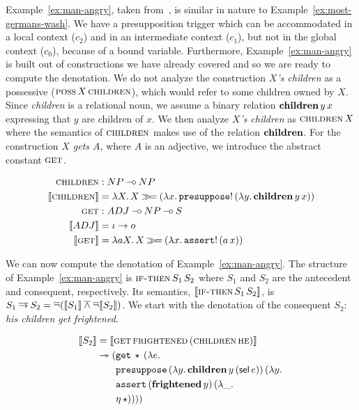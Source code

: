 Example~\ref{ex:man-angry}, taken from~\cite{van1992presupposition}, is
similar in nature to Example~\ref{ex:most-germans-wash}. We have a
presupposition trigger which can be accommodated in a local context ($c_2$)
and in an intermediate context ($c_1$), but not in the global context
($c_0$), because of a bound variable. Furthermore,
Example~\ref{ex:man-angry} is built out of constructions we have already
covered and so we are ready to compute the denotation. We do not analyze
the construction \emph{$X$'s children} as a possessive
($\textsc{poss}\,X\,\textsc{children}$), which would refer to some children
owned by $X$. Since \emph{children} is a relational noun, we assume a
binary relation $\textbf{children}\,y\,x$ expressing that $y$ are children of
$x$. We then analyze \emph{$X$'s children} as $\textsc{children}\,X$
where the semantics of $\textsc{children}$ makes use of the relation
$\textbf{children}$. For the construction \emph{$X$ gets $A$}, where $A$ is an
adjective, we introduce the abstract constant $\textsc{get}$.

\begin{align*}
  \textsc{children} &: NP \mathbin{{-}\mkern-3.5mu{\circ}} NP \\
  \llbracket \textsc{children} \rrbracket &= \lambda X.\, X \mathbin{\gg\!=} (\lambda x.\, \mathtt{presuppose}!\,(\lambda y.\, \textbf{children}\,y\,x)) \\
  \textsc{get} &: ADJ \mathbin{{-}\mkern-3.5mu{\circ}} NP \mathbin{{-}\mkern-3.5mu{\circ}} S \\
  \llbracket ADJ \rrbracket &= \iota \to o \\
  \llbracket \textsc{get} \rrbracket &= \lambda a X.\, X \mathbin{\gg\!=} (\lambda x.\, \mathtt{assert}!\,(a\,x))
\end{align*}

We can now compute the denotation of Example~\ref{ex:man-angry}. The
structure of Example~\ref{ex:man-angry} is $\textsc{if-then}\,S_1\,S_2$
where $S_1$ and $S_2$ are the antecedent and consequent, respectively. Its
semantics, $\llbracket \textsc{if-then}\,S_1\,S_2 \rrbracket$, is
$S_1 \mathbin{\overline{\to}} S_2 = \mathop{\overline{\lnot}} (\llbracket S_1 \rrbracket \mathbin{\overline{\land}} \mathop{\overline{\lnot}} \llbracket S_2 \rrbracket)$. We start with
the denotation of the consequent $S_2$: \emph{his children get frightened}.

\begin{align*}
  \llbracket S_2 \rrbracket
  &= \llbracket \textsc{get}\,\textsc{frightened}\,(\textsc{children}\,\textsc{he}) \rrbracket \\
  &\twoheadrightarrow 
    \begin{aligned}[t]
      (&\mathtt{get}\,\star\,(\lambda e.\,  \\
       &\mathtt{presuppose}\,(\lambda y.\, \textbf{children}\,y\,(\textsf{sel}\,e))\,(\lambda y.\,  \\
       &\mathtt{assert}\,(\textbf{frightened}\,y)\,(\lambda \_.\,  \\
       &\eta\,\star))))
    \end{aligned}
\end{align*}

